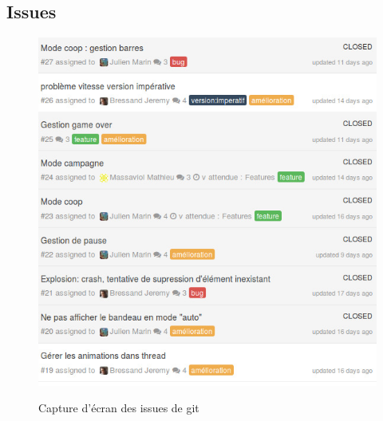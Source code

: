   \newpage
  \subsection{Issues}
  	\begin{figure}[hb!]
   	  \caption{Capture d'écran des issues de git}
  	  \includegraphics[width=1.1\textwidth]{img/issues.jpg}\\[2em]
  	\end{figure}
  
  \newpage
